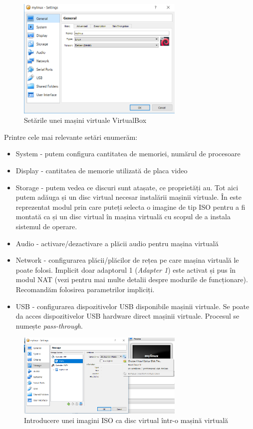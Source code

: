 \begin{figure}[!htbp]
	\centering
	\includegraphics[width=8cm]{chapters/14-vm/img/vbox-settings-img.png}
	\caption{Setările unei mașini virtuale VirtualBox}
	\label{fig:vm-vbox-settings}
\end{figure}

Printre cele mai relevante setări enumerăm:

\begin{itemize}
	\item System - putem configura cantitatea de memoriei, numărul de
		procesoare
	\item Display - cantitatea de memorie utilizată de placa video
	\item Storage - putem vedea ce discuri sunt atașate, ce proprietăți au.
		Tot aici putem adăuga și un disc virtual necesar instalării
		mașinii virtuale. În 
		este reprezentat modul prin care puteți selecta o imagine de tip
		ISO pentru a fi montată ca și un disc virtual în mașina virtuală
		cu scopul de a instala sistemul de operare.
	\item Audio - activare/dezactivare a plăcii audio pentru mașina virtuală
	\item Network - configurarea plăcii/plăcilor de rețea pe care mașina
		virtuală le poate folosi. Implicit doar adaptorul 1
		(\textit{Adapter 1}) este activat și pus în modul NAT (vezi
		 pentru mai multe
		detalii despre modurile de funcționare). Recomandăm folosirea
		parametrilor impliciți.
	\item USB - configurarea dispozitivelor USB disponibile mașinii
		virtuale. Se poate da acces dispozitivelor USB hardware direct
		mașinii virtuale. Procesul se numește \textit{pass-through}.
\end{itemize}

\begin{figure}[!htbp]
	\centering
	\includegraphics[width=8cm]{chapters/14-vm/img/vbox-iso-img.png}
	\caption{Introducere unei imagini ISO ca disc virtual într-o mașină virtuală}
	\label{fig:vm-vbox-iso}
\end{figure}

